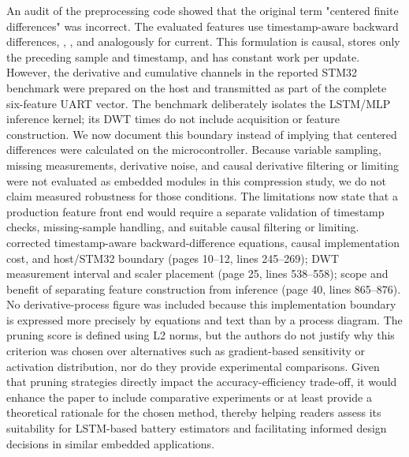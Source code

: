 {} An audit of the preprocessing code showed that the original term "centered finite differences" was incorrect. The evaluated features use timestamp-aware backward differences,\markdownRendererParagraphSeparator
{},\markdownRendererParagraphSeparator
{}, and analogously for current.\markdownRendererParagraphSeparator
{}This formulation is causal, stores only the preceding sample and timestamp, and has constant work per update. However, the derivative and cumulative channels in the reported STM32 benchmark were prepared on the host and transmitted as part of the complete six-feature UART vector. The benchmark deliberately isolates the LSTM/MLP inference kernel; its DWT times do not include acquisition or feature construction. We now document this boundary instead of implying that centered differences were calculated on the microcontroller.\markdownRendererParagraphSeparator
{}Because variable sampling, missing measurements, derivative noise, and causal derivative filtering or limiting were not evaluated as embedded modules in this compression study, we do not claim measured robustness for those conditions. The limitations now state that a production feature front end would require a separate validation of timestamp checks, missing-sample handling, and suitable causal filtering or limiting.\markdownRendererParagraphSeparator
{} corrected timestamp-aware backward-difference equations, causal implementation cost, and host/STM32 boundary (pages 10--12, lines 245--269); DWT measurement interval and scaler placement (page 25, lines 538--558); scope and benefit of separating feature construction from inference (page 40, lines 865--876). No derivative-process figure was included because this implementation boundary is expressed more precisely by equations and text than by a process diagram.\markdownRendererInterblockSeparator
{}
\markdownRendererSectionEnd \markdownRendererSectionBegin
{}\markdownRendererInterblockSeparator
{}\markdownRendererBlockQuoteBegin
The pruning score is defined using L2 norms, but the authors do not justify why this criterion was chosen over alternatives such as gradient-based sensitivity or activation distribution, nor do they provide experimental comparisons. Given that pruning strategies directly impact the accuracy-efficiency trade-off, it would enhance the paper to include comparative experiments or at least provide a theoretical rationale for the chosen method, thereby helping readers assess its suitability for LSTM-based battery estimators and facilitating informed design decisions in similar embedded applications.\markdownRendererBlockQuoteEnd \markdownRendererInterblockSeparator
